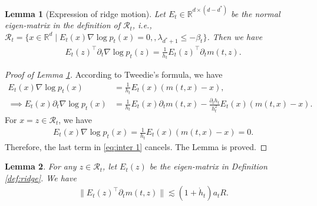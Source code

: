 \documentclass[11pt]{article}
\newcommand{\mb}{\mathbb}
\newcommand{\mc}{\mathcal}
\newtheorem{lemma}{Lemma}[section]
\begin{document}
\begin{lemma}[Expression of ridge motion]\label{lem:ridge motion expression} Let $E_t\in \mb{R}^{d\times(d-d^*)}$ be the normal eigen-matrix in the definition of $\mc{R}_t$, i.e., $\mc{R}_t = \{ x\in \mb{R}^d \mid E_t(x)\nabla \log p_t(x)=0,, \lambda_{d^*+1}\le -\beta_t  \}$. Then we have
\begin{align*}
    E_t(z)^\intercal \partial_t \nabla\log p_t(z) = \frac{1}{h_t} E_t(z)^\intercal \partial_t m(t,z).
\end{align*}   
\end{lemma}
\begin{proof}[Proof of Lemma \ref{lem:ridge motion expression}] According to Tweedie's formula, we have
\begin{align}
    E_t(x)\nabla\log p_t(x) & = \frac{1}{h_t} E_t(x) (m(t,x)-x), \nonumber \\
    \implies  E_t(x)\partial_t \nabla\log p_t(x) & = \frac{1}{h_t} E_t(x) \partial_t m(t,x) - \frac{\partial_t h_t}{h_t^2} E_t(x)(m(t,x) -x) .\label{eq:inter 1}
\end{align}
For $x=z\in \mc{R}_t$, we have
\begin{align*}
    E_t(x)\nabla \log p_t(x) = \frac{1}{h_t} E_t(x) (m(t,x)-x) =0.
\end{align*}
Therefore, the last term in \eqref{eq:inter 1} cancels. The Lemma is proved.
\end{proof}
\begin{lemma}\label{lem:key estimation} For any $z\in \mc{R}_t$, let $E_t(z)$ be the eigen-matrix in Definition \ref{def:ridge}. We have
\begin{align*}
     \| E_t(z)^\intercal \partial_t m(t,z) \| \lesssim (1+\Dot{h}_t) a_t R .
\end{align*}  
\end{lemma}
\end{document}
